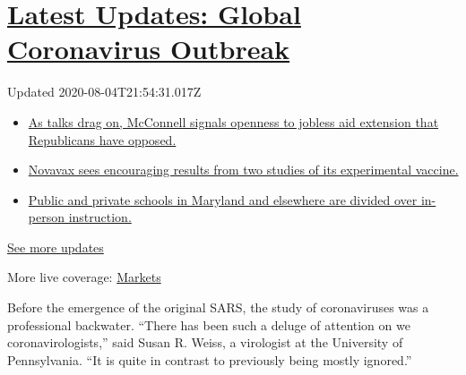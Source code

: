 \hypertarget{latest-updates-global-coronavirus-outbreak}{%
\section{\texorpdfstring{\href{https://www.nytimes3xbfgragh.onion/2020/08/04/world/coronavirus-cases.html?action=click\&pgtype=Article\&state=default\&region=MAIN_CONTENT_1\&context=storylines_live_updates}{Latest
Updates: Global Coronavirus
Outbreak}}{Latest Updates: Global Coronavirus Outbreak}}\label{latest-updates-global-coronavirus-outbreak}}

Updated 2020-08-04T21:54:31.017Z

\begin{itemize}
\tightlist
\item
  \href{https://www.nytimes3xbfgragh.onion/2020/08/04/world/coronavirus-cases.html?action=click\&pgtype=Article\&state=default\&region=MAIN_CONTENT_1\&context=storylines_live_updates\#link-2daa96b5}{As
  talks drag on, McConnell signals openness to jobless aid extension
  that Republicans have opposed.}
\item
  \href{https://www.nytimes3xbfgragh.onion/2020/08/04/world/coronavirus-cases.html?action=click\&pgtype=Article\&state=default\&region=MAIN_CONTENT_1\&context=storylines_live_updates\#link-1228a480}{Novavax
  sees encouraging results from two studies of its experimental
  vaccine.}
\item
  \href{https://www.nytimes3xbfgragh.onion/2020/08/04/world/coronavirus-cases.html?action=click\&pgtype=Article\&state=default\&region=MAIN_CONTENT_1\&context=storylines_live_updates\#link-4825b93}{Public
  and private schools in Maryland and elsewhere are divided over
  in-person instruction.}
\end{itemize}

\href{https://www.nytimes3xbfgragh.onion/2020/08/04/world/coronavirus-cases.html?action=click\&pgtype=Article\&state=default\&region=MAIN_CONTENT_1\&context=storylines_live_updates}{See
more updates}

More live coverage:
\href{https://www.nytimes3xbfgragh.onion/live/2020/08/04/business/stock-market-today-coronavirus?action=click\&pgtype=Article\&state=default\&region=MAIN_CONTENT_1\&context=storylines_live_updates}{Markets}

Before the emergence of the original SARS, the study of coronaviruses
was a professional backwater. ``There has been such a deluge of
attention on we coronavirologists,'' said Susan R. Weiss, a virologist
at the University of Pennsylvania. ``It is quite in contrast to
previously being mostly ignored.''

